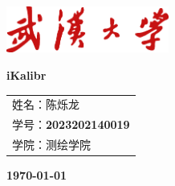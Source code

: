 \documentclass[12pt, onecolumn]{article}
\title{\normf{编程：观测值逐次更新的扩展卡尔曼滤波器}}
\author{\normf 姓名：陈烁龙\;\;\;学号：2023202140019\;\;\;学院：测绘学院}
\date{\normf{\today}}
\begin{document}
	\begin{titlepage}
	    \centering
	    \includegraphics[width=0.4\textwidth]{whu_red.png}\par\vspace{1cm}
	    \vspace{4cm}
	    {\huge\kaishu\bfseries iKalibr\par}
	    \vspace{3cm}
	    {\Large\kaishu 
	    \begin{center}\begin{tabular}{l}
	    姓名：陈烁龙\\
	    学号：\bfseries 2023202140019\\
	    学院：测绘学院
	    \end{tabular}\end{center}
	     \par}
	    
	
	    \vfill
	
	    {\large\kaishu\bfseries \today\par}
	\end{titlepage}
 		\thispagestyle{empty}
		\clearpage
		
		\tableofcontents
		\newpage
		\listoffigures
		
		\clearpage
		\setcounter{page}{1}
	
\end{document}
